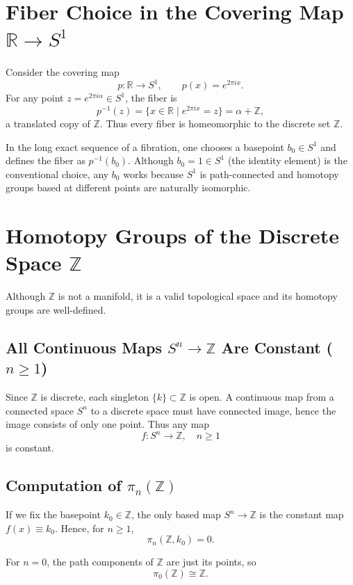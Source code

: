\documentclass[12pt]{article}
\begin{document}
\section{Fiber Choice in the Covering Map $\mathbb{R}\to S^1$}

Consider the covering map
\[
p:\mathbb{R}\longrightarrow S^1,\qquad p(x)=e^{2\pi i x}.
\]
For any point $z=e^{2\pi i\alpha}\in S^1$, the fiber is
\[
p^{-1}(z)=\{x\in\mathbb{R}\mid e^{2\pi i x}=z\}=\alpha+\mathbb{Z},
\]
a translated copy of $\mathbb{Z}$.  
Thus every fiber is homeomorphic to the discrete set $\mathbb{Z}$.

In the long exact sequence of a fibration, one chooses a basepoint $b_0\in S^1$
and defines the fiber as $p^{-1}(b_0)$.  
Although $b_0=1\in S^1$ (the identity element) is the conventional choice,
any $b_0$ works because $S^1$ is path-connected and homotopy groups based
at different points are naturally isomorphic.

\section{Homotopy Groups of the Discrete Space $\mathbb{Z}$}

Although $\mathbb{Z}$ is not a manifold, it is a valid topological space
and its homotopy groups are well-defined.

\subsection{All Continuous Maps $S^n\to\mathbb{Z}$ Are Constant ($n\ge 1$)}

Since $\mathbb{Z}$ is discrete, each singleton $\{k\}\subset\mathbb{Z}$ is open.
A continuous map from a connected space $S^n$ to a discrete space must have
connected image, hence the image consists of only one point.  
Thus any map
\[
f:S^n\to\mathbb{Z},\quad n\ge1
\]
is constant.

\subsection{Computation of $\pi_n(\mathbb{Z})$}

If we fix the basepoint $k_0\in\mathbb{Z}$, the only based map
$S^n\to\mathbb{Z}$ is the constant map $f(x)\equiv k_0$.  
Hence, for $n\ge1$,
\[
\pi_{n}(\mathbb{Z},k_0)=0.
\]

For $n=0$, the path components of $\mathbb{Z}$ are just its points, so
\[
\pi_0(\mathbb{Z})\cong\mathbb{Z}.
\]
\end{document}
